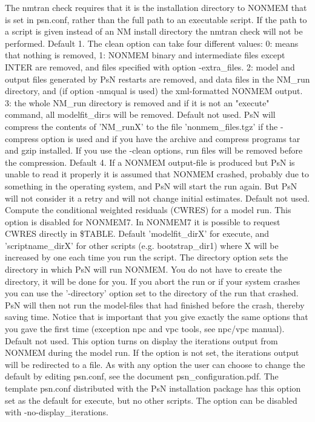 \begin{optionlist}
The nmtran check requires that it is the installation directory to NONMEM that is set in psn.conf, rather than the full path to an executable script. If the path to a script is given instead of an NM install directory the nmtran check will not be performed.
\nextopt
{}
Default 1. The clean option can take four different values:  0: means that nothing is removed, 1: NONMEM binary and intermediate files except INTER are removed, and files specified with option -extra\_files. 2: model and output files generated by PsN restarts are removed, and data files in the NM\_run directory, and (if option -nmqual is used) the xml-formatted NONMEM output. 3: the whole NM\_run directory is removed and if it is not an "execute" command, all modelfit\_dir:s will be removed. 
\nextopt
{}
Default not used. PsN will compress the contents of 'NM\_runX' to the file 'nonmem\_files.tgz' if the -compress option is used and if you have the archive and compress programs tar and gzip installed. If you use the -clean options, run files will be removed before the compression.  
\nextopt
{}
Default 4. If a NONMEM output-file is produced but PsN is unable to read it properly it is assumed that NONMEM crashed, probably due to something in the operating system, and PsN will start the run again. But PsN will not consider it a retry and will not change initial estimates. 
\nextopt
{}
Default not used. Compute the conditional weighted residuals (CWRES) for a model run. This option is disabled for NONMEM7. In NONMEM7 it is possible to request CWRES directly in \$TABLE. 
\nextopt
{}
Default 'modelfit\_dirX' for execute, and 'scriptname\_dirX' for other scripts (e.g. bootstrap\_dir1) where X will be increased by one each time you run the script. The directory option sets the directory in which PsN will run  NONMEM. You do not have to create the directory,  it will be done for you. If you abort the run or if your system crashes you can use the '-directory' option set to the directory of the run that crashed. PsN will then not run the model-files that had finished before the crash, thereby saving time. Notice that is important that you give exactly the same options that you gave the first time (exception npc and vpc tools, see npc/vpc manual). 
\nextopt
{}
Default not used.  This option turns on display the iterations output from NONMEM during the model run. If the option is not set, the iterations output will be redirected to a file. As with any option the user can choose to change the default by editing psn.conf, see the document psn\_configuration.pdf. The template psn.conf distributed with the PsN installation package has this option set as the default for execute, but no other scripts. The option can be disabled with -no-display\_iterations. 

\end{optionlist}

